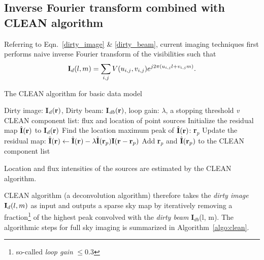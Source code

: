 \documentclass{article}
\begin{document}
\subsection{Inverse Fourier transform combined with CLEAN algorithm}
Referring to Eqn.~\ref{dirty_image} \& \ref{dirty_beam}, current imaging techniques first performs naive inverse Fourier transform of the visibilities such that
\begin{equation}
{\bf I}_{d}(l, m) = \sum_{i, j} V(u_{i, j}, v_{i, j})e^{j2\pi (u_{i, j}l+v_{i, j}m)}.
\end{equation}

\begin{algorithm}[t]
   \caption{The CLEAN algorithm for basic data model}
   \label{algo:clean}
\begin{algorithmic}
    {Dirty image: {\bf I}${}_{d}({\bf r})$, Dirty beam: {\bf I}${}_{db}({\bf r})$, loop gain: $\lambda$, a stopping threshold {\it v}} 
    CLEAN component list: flux and location of point sources
   \REPEAT 
   \STATE Initialize the residual map $\hat{\bf I}({\bf r})$ to {\bf I}${}_{d}({\bf r})$
   \STATE Find the location maximum peak of $\hat{\bf I}({\bf r})$: {\bf r${}_p$}
   \STATE  Update the residual map: $\hat{\bf I}({\bf r}) \leftarrow \hat{\bf I}({\bf r}) - \lambda \hat{\bf I}({\bf r}_p) {\bf I}({\bf r}-{\bf r}_p)$
   \STATE Add {\bf r}${}_p$ and $\hat{\bf I}({\bf r}_p)$ to the CLEAN component list
   \ENDFOR
\end{algorithmic}
\end{algorithm}
Location and flux intensities of the sources are estimated by the CLEAN algorithm.

CLEAN algorithm (a deconvolution algorithm) therefore takes the {\it dirty image} ${\bf I}_d(l, m)$ as input and outputs a sparse sky map by iteratively removing a fraction\footnote{so-called {\it loop gain} $\leq 0.3$} of the highest peak convolved with the {\it dirty beam} {\bf I}${}_{db}$(l, m). The algorithmic steps for full sky imaging is summarized in Algorithm~\ref{algo:clean}.
\end{document}
